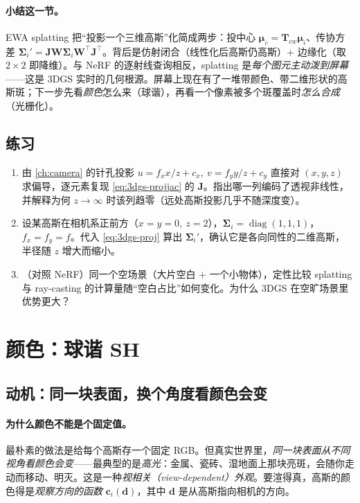 \paragraph{小结这一节。}
EWA splatting 把“投影一个三维高斯”化简成两步：投中心 $\boldsymbol\mu_c=\mathbf T_{cw}\boldsymbol\mu_i$、传协方差 $\boldsymbol\Sigma_i'=\mathbf J\mathbf W\boldsymbol\Sigma_i\mathbf W^\top\mathbf J^\top$。背后是仿射闭合（线性化后高斯仍高斯）$+$ 边缘化（取 $2\times2$ 即降维）。与 NeRF 的逐射线查询相反，splatting 是\emph{每个图元主动泼到屏幕}——这是 3DGS 实时的几何根源。屏幕上现在有了一堆带颜色、带二维形状的高斯斑；下一步先看\emph{颜色}怎么来（球谐），再看一个像素被多个斑覆盖时\emph{怎么合成}（光栅化）。

\subsection*{练习}
\begin{enumerate}
  \item 由 \cref{ch:camera} 的针孔投影 $u=f_x x/z+c_x,\ v=f_y y/z+c_y$ 直接对 $(x,y,z)$ 求偏导，逐元素复现 \cref{eq:3dgs-projjac} 的 $\mathbf J$。指出哪一列编码了透视非线性，并解释为何 $z\to\infty$ 时该列趋零（远处高斯投影几乎不随深度变）。
  \item 设某高斯在相机系正前方（$x=y=0,\ z=2$），$\boldsymbol\Sigma_i=\operatorname{diag}(1,1,1)$，$f_x=f_y=f$。代入 \cref{eq:3dgs-proj} 算出 $\boldsymbol\Sigma_i'$，确认它是各向同性的二维高斯，半径随 $z$ 增大而缩小。
  \item （对照 NeRF）同一个空场景（大片空白 $+$ 一个小物体），定性比较 splatting 与 ray-casting 的计算量随“空白占比”如何变化。为什么 3DGS 在空旷场景里优势更大？
\end{enumerate}

\section{颜色：球谐 SH}
\label{sec:3dgs-color}

\subsection{动机：同一块表面，换个角度看颜色会变}

\paragraph{为什么颜色不能是个固定值。}
最朴素的做法是给每个高斯存一个固定 RGB。但真实世界里，\emph{同一块表面从不同视角看颜色会变}——最典型的是\emph{高光}：金属、瓷砖、湿地面上那块亮斑，会随你走动而移动、明灭。这是一种\emph{视相关（view-dependent）外观}。要渲得真，高斯的颜色得是\emph{观察方向的函数} $\mathbf c_i(\mathbf d)$，其中 $\mathbf d$ 是从高斯指向相机的方向。

